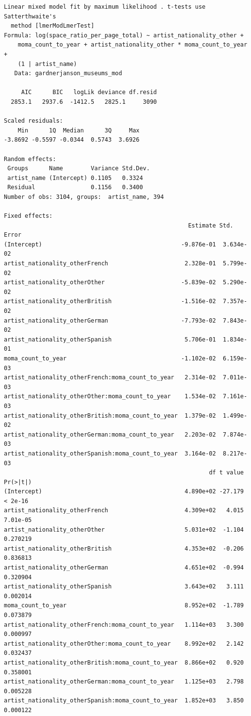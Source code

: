 \documentclass[
  letterpaper,
  DIV=11,
  numbers=noendperiod]{scrreprt}
\begin{document}
\begin{verbatim}
Linear mixed model fit by maximum likelihood . t-tests use Satterthwaite's
  method [lmerModLmerTest]
Formula: log(space_ratio_per_page_total) ~ artist_nationality_other +  
    moma_count_to_year + artist_nationality_other * moma_count_to_year +  
    (1 | artist_name)
   Data: gardnerjanson_museums_mod

     AIC      BIC   logLik deviance df.resid 
  2853.1   2937.6  -1412.5   2825.1     3090 

Scaled residuals: 
    Min      1Q  Median      3Q     Max 
-3.8692 -0.5597 -0.0344  0.5743  3.6926 

Random effects:
 Groups      Name        Variance Std.Dev.
 artist_name (Intercept) 0.1105   0.3324  
 Residual                0.1156   0.3400  
Number of obs: 3104, groups:  artist_name, 394

Fixed effects:
                                                     Estimate Std. Error
(Intercept)                                        -9.876e-01  3.634e-02
artist_nationality_otherFrench                      2.328e-01  5.799e-02
artist_nationality_otherOther                      -5.839e-02  5.290e-02
artist_nationality_otherBritish                    -1.516e-02  7.357e-02
artist_nationality_otherGerman                     -7.793e-02  7.843e-02
artist_nationality_otherSpanish                     5.706e-01  1.834e-01
moma_count_to_year                                 -1.102e-02  6.159e-03
artist_nationality_otherFrench:moma_count_to_year   2.314e-02  7.011e-03
artist_nationality_otherOther:moma_count_to_year    1.534e-02  7.161e-03
artist_nationality_otherBritish:moma_count_to_year  1.379e-02  1.499e-02
artist_nationality_otherGerman:moma_count_to_year   2.203e-02  7.874e-03
artist_nationality_otherSpanish:moma_count_to_year  3.164e-02  8.217e-03
                                                           df t value Pr(>|t|)
(Intercept)                                         4.890e+02 -27.179  < 2e-16
artist_nationality_otherFrench                      4.309e+02   4.015 7.01e-05
artist_nationality_otherOther                       5.031e+02  -1.104 0.270219
artist_nationality_otherBritish                     4.353e+02  -0.206 0.836813
artist_nationality_otherGerman                      4.651e+02  -0.994 0.320904
artist_nationality_otherSpanish                     3.643e+02   3.111 0.002014
moma_count_to_year                                  8.952e+02  -1.789 0.073879
artist_nationality_otherFrench:moma_count_to_year   1.114e+03   3.300 0.000997
artist_nationality_otherOther:moma_count_to_year    8.992e+02   2.142 0.032437
artist_nationality_otherBritish:moma_count_to_year  8.866e+02   0.920 0.358001
artist_nationality_otherGerman:moma_count_to_year   1.125e+03   2.798 0.005228
artist_nationality_otherSpanish:moma_count_to_year  1.852e+03   3.850 0.000122
                                                      

\end{verbatim}
\end{document}
